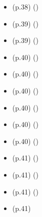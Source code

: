 \begin{isabellebody}
\begin{isamarkuptext}
\begin{itemize}
    \item (p.38)  
      \hfill ()
    \item (p.39)  
      \hfill ()
    \item (p.39)  
      \hfill ()
    \item (p.40)  
      \hfill ()
    \item (p.40)  
      \hfill ()
    \item (p.40)  
      \hfill ()
    \item (p.40)  
      \hfill ()
    \item (p.40)  
      \hfill ()
    \item (p.40)  
      \hfill ()
    \item (p.41)  
      \hfill ()
    \item (p.41)  
      \hfill ()
    \item (p.41)  
      \hfill ()
    \item (p.41)  

\end{itemize}
\end{isamarkuptext}
\end{isabellebody}
